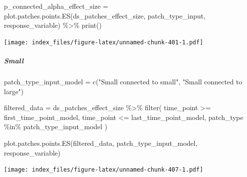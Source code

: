 \documentclass[
]{article}
\newenvironment{Shaded}{\begin{snugshade}}{\end{snugshade}}
\newcommand{\FunctionTok}[1]{\textcolor[rgb]{0.00,0.00,0.00}{#1}}
\newcommand{\NormalTok}[1]{#1}
\newcommand{\OtherTok}[1]{\textcolor[rgb]{0.56,0.35,0.01}{#1}}
\newcommand{\SpecialCharTok}[1]{\textcolor[rgb]{0.00,0.00,0.00}{#1}}
\newcommand{\StringTok}[1]{\textcolor[rgb]{0.31,0.60,0.02}{#1}}
\begin{document}
\begin{Shaded}
\begin{Highlighting}[]
\NormalTok{p\_connected\_alpha\_effect\_size }\OtherTok{=} \FunctionTok{plot.patches.points.ES}\NormalTok{(ds\_patches\_effect\_size, }
\NormalTok{                                                       patch\_type\_input,}
\NormalTok{                                                       response\_variable) }\SpecialCharTok{\%\textgreater{}\%}
  \FunctionTok{print}\NormalTok{()}
\end{Highlighting}
\end{Shaded}

\texttt{[image: index\_files/figure-latex/unnamed-chunk-401-1.pdf]}

\hypertarget{small-2}{%
\subparagraph{Small}\label{small-2}}

\begin{Shaded}
\begin{Highlighting}[]
\NormalTok{patch\_type\_input\_model }\OtherTok{=} \FunctionTok{c}\NormalTok{(}\StringTok{"Small connected to small"}\NormalTok{,}
                           \StringTok{"Small connected to large"}\NormalTok{)}
\end{Highlighting}
\end{Shaded}

\begin{Shaded}
\begin{Highlighting}[]
\NormalTok{filtered\_data }\OtherTok{=}\NormalTok{ ds\_patches\_effect\_size }\SpecialCharTok{\%\textgreater{}\%}
  \FunctionTok{filter}\NormalTok{(}
\NormalTok{    time\_point }\SpecialCharTok{\textgreater{}=}\NormalTok{ first\_time\_point\_model,}
\NormalTok{    time\_point }\SpecialCharTok{\textless{}=}\NormalTok{ last\_time\_point\_model,}
\NormalTok{    patch\_type }\SpecialCharTok{\%in\%}\NormalTok{ patch\_type\_input\_model}
\NormalTok{  )}
\end{Highlighting}
\end{Shaded}

\begin{Shaded}
\begin{Highlighting}[]
\FunctionTok{plot.patches.points.ES}\NormalTok{(filtered\_data,}
\NormalTok{                       patch\_type\_input\_model,}
\NormalTok{                       response\_variable)}
\end{Highlighting}
\end{Shaded}

\texttt{[image: index\_files/figure-latex/unnamed-chunk-407-1.pdf]}
\end{document}
